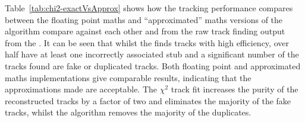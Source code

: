 Table~\ref{tab:chi2-exactVsApprox} shows how the tracking performance compares between the floating point maths and ``approximated'' maths versions of the algorithm compare against each other and from the raw track finding output from the \HT.
It can be seen that whilst the \HT finds tracks with high efficiency, over half have at least one incorrectly associated stub and a significant number of the tracks found are fake or duplicated tracks.
Both floating point and approximated maths implementations give comparable results, indicating that the approximations made are acceptable.
The $\chi^{2}$ track fit increases the purity of the reconstructed tracks by a factor of two and eliminates the majority of the fake tracks, whilst the \DR algorithm removes the majority of the duplicates.



